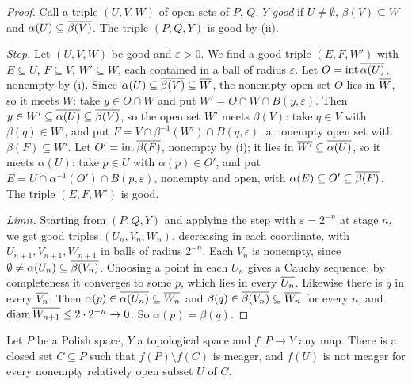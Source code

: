 \begin{proof}
Call a triple $(U,V,W)$ of open sets of $P$, $Q$, $Y$ \emph{good} if $U\ne\emptyset$, $\beta(V)\subseteq W$
and $\alpha(U)\subseteq\overline{\beta(V)}$. The triple $(P,Q,Y)$ is good by (ii).

\emph{Step.} Let $(U,V,W)$ be good and $\varepsilon>0$. We find a good triple $(E,F,W')$ with $E\subseteq U$,
$F\subseteq V$, $W'\subseteq W$, each contained in a ball of radius $\varepsilon$. Let
$O=\operatorname{int}\overline{\alpha(U)}$, nonempty by (i). Since $\alpha(U)\subseteq\overline{\beta(V)}\subseteq\overline{W}$, the
nonempty open set $O$ lies in $\overline{W}$, so it meets $W$: take $y\in O\cap W$ and put $W'=O\cap W\cap
B(y,\varepsilon)$. Then $y\in W'\subseteq\overline{\alpha(U)}\subseteq\overline{\beta(V)}$, so the open set $W'$ meets
$\beta(V)$: take $q\in V$ with $\beta(q)\in W'$, and put $F=V\cap\beta^{-1}(W')\cap B(q,\varepsilon)$, a
nonempty open set with $\beta(F)\subseteq W'$. Let $O'=\operatorname{int}\overline{\beta(F)}$, nonempty by (i); it lies in
$\overline{W'}\subseteq\overline{\alpha(U)}$, so it meets $\alpha(U)$: take $p\in U$ with $\alpha(p)\in O'$, and put
$E=U\cap\alpha^{-1}(O')\cap B(p,\varepsilon)$, nonempty and open, with $\alpha(E)\subseteq
O'\subseteq\overline{\beta(F)}$. The triple $(E,F,W')$ is good.

\emph{Limit.} Starting from $(P,Q,Y)$ and applying the step with $\varepsilon=2^{-n}$ at stage $n$, we
get good triples $(U_n,V_n,W_n)$, decreasing in each coordinate, with $U_{n+1},V_{n+1},W_{n+1}$ in balls
of radius $2^{-n}$. Each $V_n$ is nonempty, since $\emptyset\ne\alpha(U_n)\subseteq\overline{\beta(V_n)}$. Choosing a
point in each $U_n$ gives a Cauchy sequence; by completeness it converges to some $p$, which lies in
every $\overline{U_n}$. Likewise there is $q$ in every $\overline{V_n}$. Then $\alpha(p)\in\overline{\alpha(U_n)}\subseteq\overline{W_n}$
and $\beta(q)\in\overline{\beta(V_n)}\subseteq\overline{W_n}$ for every $n$, and $\operatorname{diam}\overline{W_{n+1}}\le2\cdot2^{-n}\to0$.
So $\alpha(p)=\beta(q)$.
\end{proof}


\begin{lemma}\label{lem:reduced}
Let $P$ be a Polish space, $Y$ a topological space and $f\colon P\to Y$ any map. There is a closed set
$C\subseteq P$ such that $f(P)\setminus f(C)$ is meager, and $f(U)$ is not meager for every nonempty
relatively open subset $U$ of $C$.
\end{lemma}


